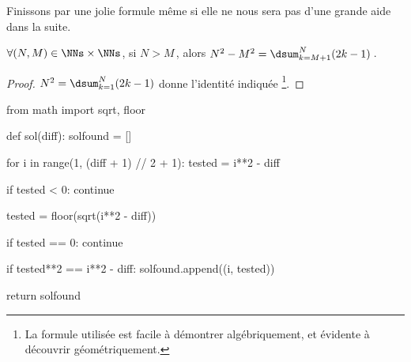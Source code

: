 	


Finissons par une jolie formule même si elle ne nous sera pas d'une grande aide dans la suite.


\begin{fact} \label{dist-square}
	$\forall (N, M) \in \NNs \times \NNs$, 
	si $N > M$\,, alors $N^2 - M^2 = \dsum_{k=M+1}^{N} (2 k - 1)$\,.
\end{fact}


\begin{proof}
	$N^2 = \dsum_{k=1}^{N} (2 k - 1)$ donne l'identité indiquée
	\footnote{
		La formule utilisée est facile à démontrer algébriquement, et évidente à découvrir géométriquement.
	}.
\end{proof}

	


\newpage
\bgroup
\small
\begin{Python}
from math import sqrt, floor

def sol(diff):
    solfound = []

    for i in range(1, (diff + 1) // 2 + 1):
        tested = i**2 - diff

        if tested < 0:
            continue

        tested = floor(sqrt(i**2 - diff))

        if tested == 0:
            continue

        if tested**2 == i**2 - diff:
            solfound.append((i, tested))

    return solfound
\end{Python}
\egroup